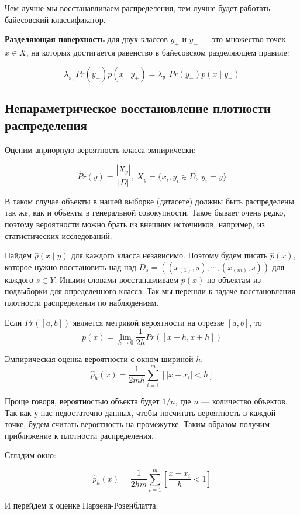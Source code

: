 Чем лучше мы восстанавливаем распределения, тем лучше будет работать
байесовский классификатор.

\textbf{Разделяющая поверхность} для двух классов $y_+$ и $y_-$ --- это множество точек
$x \in X$, на которых достигается равенство в байесовском разделяющем правиле:

\[
    \lambda_{y_+} Pr(y_+) p(x \mid y_+) = \lambda_{y_-}Pr(y_-) p(x \mid y_-)
\]


\subsection{Непараметрическое восстановление плотности распределения}

Оценим априорную вероятность класса эмпирически:

\[
    \hat Pr(y) = \frac{|X_y|}{|D|},\ X_y = \{x_i, y_i \in D,\ y_i = y \}
\]

В таком случае объекты в нашей выборке (датасете) должны быть распределены так
же, как и объекты в генеральной совокупности. Такое бывает очень редко,
поэтому вероятности можно брать из внешних источников, например, из
статистических исследований.

Найдем $\hat p(x \mid y)$ для каждого класса независимо. Поэтому будем писать
$\hat p(x)$, которое нужно восстановить над над $D_s = ((x_{(1)}, s), \cdots,
(x_{(m)}, s))$ для каждого $s \in Y$. Иными словами восстанавливаем $p(x)$ по
объектам из подвыборки для определенного класса. Так мы перешли к задаче
восстановления плотности распределения по наблюдениям.

Если $Pr([a, b])$ является метрикой вероятности на отрезке $[a, b]$, то
\[
    p(x) = \lim_{h \to 0} \frac{1}{2h} Pr([x - h, x + h])
\]

Эмпирическая оценка вероятности с окном шириной $h$:
\[
    \hat p_h(x) = \frac{1}{2mh} \sum_{i=1}^m [|x - x_i| < h]
\]

Проще говоря, вероятностью объекта будет $1/n$, где $n$ --- количество
объектов. Так как у нас недостаточно данных, чтобы посчитать вероятность в
каждой точке, будем считать вероятность на промежутке. Таким образом получим
приближение к плотности распределения.


Сгладим окно:

\[
    \hat p_h(x) = \frac{1}{2hm} \sum^m_{i=1} \left[ \frac{x - x_i}{h} < 1 \right]
\]

И перейдем к оценке Парзена-Розенблатта:

